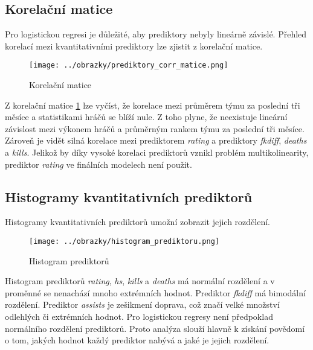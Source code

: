 \newpage
\subsection{Korelační matice}
Pro logistickou regresi je důležité, aby prediktory nebyly lineárně závislé. Přehled korelací mezi kvantitativními prediktory lze zjistit z korelační matice.

\begin{figure}[H]
    \centering
    \texttt{[image: ../obrazky/prediktory\_corr\_matice.png]}
    \caption{Korelační matice} 
    \label{fig:korelacni_matice}
\end{figure}

Z korelační matice \ref{fig:korelacni_matice} lze vyčíst, 
{\color{red}
že korelace mezi průměrem týmu za poslední tři měsíce a statistikami hráčů se blíží nule. Z toho plyne, že neexistuje lineární závislost mezi výkonem hráčů a 
průměrným rankem týmu za poslední tři měsíce.
}
Zároveň je vidět silná korelace mezi prediktorem \textit{rating} a prediktory \textit{fkdiff}, \textit{deaths} a \textit{kills}.
{\color{red}
Jelikož by díky vysoké korelaci prediktorů vznikl problém multikolinearity, prediktor \textit{rating} ve finálních modelech není použit.
}

\newpage
\subsection{Histogramy kvantitativních prediktorů}
Histogramy kvantitativních prediktorů umožní zobrazit jejich rozdělení.

\begin{figure}[H]
    \centering
    \texttt{[image: ../obrazky/histogram\_prediktoru.png]}
    \caption{Histogram prediktorů} 
    \label{fig:histogram_prediktoru}
\end{figure}

Histogram prediktorů \textit{rating}, \textit{hs}, \textit{kills} a \textit{deaths} má normální rozdělení a v proměnné se nenachází mnoho extrémních hodnot.
Prediktor \textit{fkdiff} má bimodální rozdělení. Prediktor \textit{assists} je 
{\color{red}
zešikmení
}
doprava, což značí velké množství odlehlých či extrémních hodnot. 
{\color{red}
Pro logistickou regresy není předpoklad normálního rozdělení prediktorů. Proto analýza slouží hlavně k získání povědomí o tom, 
jakých hodnot každý prediktor nabývá a jaké je jejich rozdělení.
}

